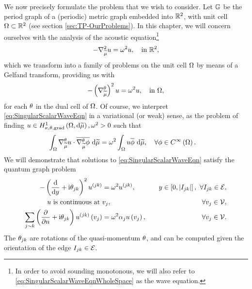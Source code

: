 We now precisely formulate the problem that we wish to consider. 
Let $\mathbb{G}$ be the period graph of a (periodic) metric graph embedded into $\mathbb{R}^2$, with unit cell $\Omega\subset\mathbb{R}^2$ (see section \ref{sec:TP-OurProblems}).
In this chapter, we will concern ourselves with the analysis of the acoustic equation\footnote{In order to avoid sounding monotonous, we will also refer to \eqref{eq:SingularScalarWaveEqnWholeSpace} as the wave equation.}
\begin{align} \label{eq:SingularScalarWaveEqnWholeSpace}
	-\nabla_{\widetilde{\mu}}^2 u = \omega^2 u, \quad\text{in } \mathbb{R}^2,
\end{align}
which we transform into a family of problems on the unit cell $\Omega$ by means of a Gelfand transform, providing us with
\begin{align} \label{eq:SingularScalarWaveEqn}
	-\left( \nabla^{\theta}_{\widetilde{\mu}} \right)^2 u = \omega^2 u, \quad\text{in } \Omega,
\end{align}
for each $\theta$ in the dual cell of $\Omega$.
Of course, we interpret \eqref{eq:SingularScalarWaveEqn} in a variational (or weak) sense, as the problem of finding $u\in H^1_{\kappa,\theta,\mathrm{grad}}\left( \Omega, \mathrm{d}\widetilde{\mu} \right), \omega^2>0$ such that
\begin{align*}
	\int_{\Omega} \nabla^{\theta}_{\widetilde{\mu}}u\cdot\overline{\nabla^{\theta}_{\widetilde{\mu}}\phi}  \ \mathrm{d}\widetilde{\mu} 
	&= \omega^2\int_{\Omega} u\overline{\phi}  \ \mathrm{d}\widetilde{\mu}, \quad\forall\phi\in C^{\infty}\left( \Omega \right).
\end{align*}
We will demonstrate that solutions to \eqref{eq:SingularScalarWaveEqn} satisfy the quantum graph problem
\begin{subequations} \label{eq:SingularWaveEqnQGProblem}
	\begin{align}
		-\left( \dfrac{\mathrm{d}}{\mathrm{d}y} + \mathrm{i}\theta_{jk} \right)^2 u^{(jk)} &= \omega^2 u^{(jk)}, \quad &y\in\left[ 0,\left\lvert I_{jk} \right\rvert \right], \ \forall I_{jk}\in\mathcal{E}, \label{eq:SingularWaveEqnQGProblem-1} \\
		u \text{ is continuous at } & v_j, \quad &\forall v_j\in\mathcal{V}, \label{eq:SingularWaveEqnQGProblem-2} \\
		\sum_{j\sim k}\left( \dfrac{\partial }{\partial n} + \mathrm{i}\theta_{jk} \right)u^{(jk)}\left( v_j \right) &= \omega^2\alpha_j u\left( v_j \right), \quad &\forall v_j\in\mathcal{V}. \label{eq:SingularWaveEqnQGProblem-3}
	\end{align}
\end{subequations}
The $\theta_{jk}$ are rotations of the quasi-momentum $\theta$, and can be computed given the orientation of the edge $I_{jk}\in\mathcal{E}$.
